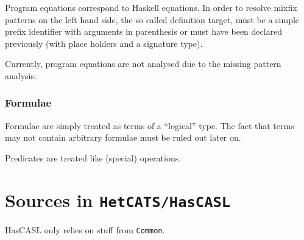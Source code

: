 \documentclass{article}
\begin{document}
Program equations correspond to Haskell equations. In order to resolve mixfix
patterns on the left hand side, the so called definition target, must be a
simple prefix identifier with arguments in parenthesis or must have been
declared previously (with place holders and a signature type).

Currently, program equations are not analysed due to the missing
pattern analysis.

\subsubsection{Formulae}

Formulae are simply treated as terms of a ``logical'' type. The fact that
terms may not contain arbitrary formulae must be ruled out later on.

Predicates are treated like (special) operations. 

\section{Sources in \texttt{HetCATS/HasCASL}}

HasCASL only relies on stuff from \texttt{Common}.
\end{document}

